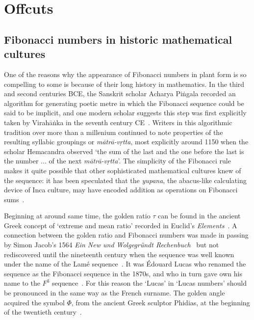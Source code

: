\documentclass{memoir}
\begin{document}
\chapter{Offcuts}

\section{Fibonacci numbers in historic mathematical cultures}
One of the reasons why the appearance of Fibonacci numbers in plant form is so compelling to some is because of their long history in mathematics. 
In the third and second centuries BCE, the Sanskrit scholar Acharya Piṅgala recorded an algorithm for generating poetic metre in which the Fibonacci sequence could be said to be implicit, and 
one modern scholar suggests this step was first explicitly taken by Virahāṅka in the seventh century CE~\autocite{singhSocalledFibonacciNumbers1985,velankarVrttajatisamuccayaKaviVirahanka1962}.  Writers in this algorithmic tradition over more than a millenium continued to note properties of the resulting syllabic groupings or \textit{mātrā-vṛtta}, most explicitly around 1150 when the scholar Hemacandra observed `the sum of the last and the one before the last is the number ... of the next \textit{mātrā-vṛtta}'\autocite{singhSocalledFibonacciNumbers1985}. The simplicity of the Fibonacci rule makes it quite possible that other sophisticated mathematical cultures knew of the sequence:  it has been speculated that the \textit{yupana}, the abacus-like calculating device of  Inca culture, may have encoded addition as operations on Fibonacci sums~\cite{leonardIncanAbacusCurious2010}.

Beginning at around same time, the golden ratio $\tau$ can be found in the ancient Greek concept of `extreme and mean ratio' recorded in Euclid's \textit{Elements}~\autocite{herz-fischlerMathematicalHistoryDivision1987}. 
A connection between the golden ratio and Fibonacci numbers was made in passing by Simon Jacob's 1564 \textit{Ein New und Wolgegründt Rechenbuch}~\cite{schreiberSupplementShallitsPaper1995} but not rediscovered until the nineteenth century when the sequence was well known under the name of the Lamé sequence~\autocite{lucasTheorieNombresPremiers1876}. It was Édouard Lucas who renamed the sequence as the Fibonacci sequence in the 1870s, and who in turn gave own his name to the $F^3$ sequence~\autocite{lucasTheorieNombresPremiers1876}. For this reason the `Lucas' in `Lucas numbers' should be pronounced in the same way as the French surname.  The golden angle acquired the symbol $\Phi$, from the ancient Greek sculptor Phidias, at the beginning of the twentieth century~\autocite{barrParametersBeauty1929}.
\end{document}
